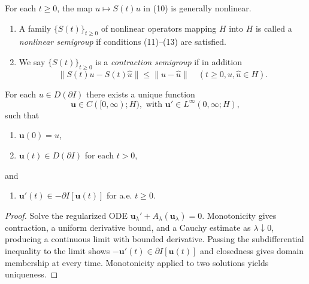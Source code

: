 \begin{remark}
\label{rem:nonlinear-semigroup-notation}
For each $t\geq0$, the map $u\mapsto S(t)u$ in (10) is generally nonlinear.
\end{remark}

\begin{definition}
\label{def:nonlinear-contraction-semigroup}
\begin{enumerate}
\item[(i)] A family $\{S(t)\}_{t \geq 0}$ of nonlinear operators mapping $H$ into $H$ is called a \textit{nonlinear semigroup} if conditions (11)--(13) are satisfied.
\item[(ii)] We say $\{S(t)\}_{t \geq 0}$ is a \textit{contraction semigroup} if in addition
\[
\|S(t)u - S(t)\hat{u}\| \leq \|u - \hat{u}\| \quad (t \geq 0, u, \hat{u} \in H).
\tag{14}
\]
\end{enumerate}
\end{definition}

\begin{theorem}
\label{thm:solution-of-gradient-flow}
For each $u \in D(\partial I)$ there exists a unique function
\[
\mathbf{u} \in C([0, \infty); H), \text{ with } \mathbf{u}' \in L^\infty(0, \infty; H),
\tag{16}
\]
such that
\begin{enumerate}
\item[(i)] $\mathbf{u}(0) = u$,
\item[(ii)] $\mathbf{u}(t) \in D(\partial I)$ for each $t > 0$,
\end{enumerate}
and
\begin{enumerate}
\item[(iii)] $\mathbf{u}'(t) \in -\partial I[\mathbf{u}(t)]$ for a.e. $t \geq 0$.
\end{enumerate}
\end{theorem}

\begin{proof}
\sketch Solve the regularized ODE $\mathbf u_\lambda'+A_\lambda(\mathbf u_\lambda)=0$. Monotonicity gives contraction, a uniform derivative bound, and a Cauchy estimate as $\lambda\downarrow0$, producing a continuous limit with bounded derivative. Passing the subdifferential inequality to the limit shows $-\mathbf u'(t)\in\partial I[\mathbf u(t)]$ and closedness gives domain membership at every time. Monotonicity applied to two solutions yields uniqueness.
\end{proof}

